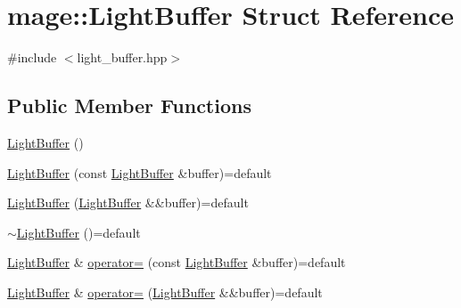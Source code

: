 \hypertarget{structmage_1_1_light_buffer}{}\section{mage\+:\+:Light\+Buffer Struct Reference}
\label{structmage_1_1_light_buffer}


{\ttfamily \#include $<$light\+\_\+buffer.\+hpp$>$}

\subsection*{Public Member Functions}
\begin{DoxyCompactItemize}
\item 
\hyperlink{structmage_1_1_light_buffer_a5ebb95f741d86b719ad25d56fac3ff66}{Light\+Buffer} ()
\item 
\hyperlink{structmage_1_1_light_buffer_a94aed51e6bdaf47c5f818f84b3e4edf4}{Light\+Buffer} (const \hyperlink{structmage_1_1_light_buffer}{Light\+Buffer} \&buffer)=default
\item 
\hyperlink{structmage_1_1_light_buffer_af0bb4f34aebc13b8cbd81e26fb8f6ecf}{Light\+Buffer} (\hyperlink{structmage_1_1_light_buffer}{Light\+Buffer} \&\&buffer)=default
\item 
\hyperlink{structmage_1_1_light_buffer_a0dc88c8ad1721b4b545c65c26c2fec69}{$\sim$\+Light\+Buffer} ()=default
\item 
\hyperlink{structmage_1_1_light_buffer}{Light\+Buffer} \& \hyperlink{structmage_1_1_light_buffer_ae3560a8dcda61fb02b86a370cd689e15}{operator=} (const \hyperlink{structmage_1_1_light_buffer}{Light\+Buffer} \&buffer)=default
\item 
\hyperlink{structmage_1_1_light_buffer}{Light\+Buffer} \& \hyperlink{structmage_1_1_light_buffer_a7a41e25c173b24a643e6a82a382c3c35}{operator=} (\hyperlink{structmage_1_1_light_buffer}{Light\+Buffer} \&\&buffer)=default
\end{DoxyCompactItemize}
